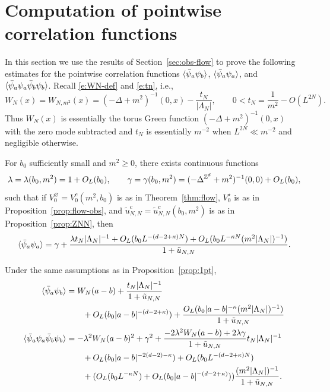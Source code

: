 \documentclass[11pt]{amsart}
\numberwithin{equation}{section}
\numberwithin{theorem}{section}
\newcommand{\1}{{\bf 1}}
\newcommand{\obs}{\star}
\newcommand{\Vbulk}{V^\varnothing}
\newcommand{\Vobs}{V^\obs}
\newcommand{\OL}{O_L}
\newcommand{\clambda}{\lambda}
\newcommand{\cgamma}{\gamma}
\begin{document}
\section{Computation of pointwise correlation functions}
\label{sec:obs}

In this section we use the results of Section~\ref{sec:obs-flow} to prove the following estimates for the pointwise
correlation functions $\langle \bar\psi_a\psi_b \rangle$,
$\langle \bar\psi_a\psi_a \rangle$, and
$\langle \bar\psi_a\psi_a\bar\psi_b\psi_b \rangle$.
Recall \eqref{e:WN-def} and   \eqref{e:tn}, i.e.,
\begin{equation}
  \label{e:WN-def-bis}
  W_N(x) = W_{N,m^2}(x) = (-\Delta+m^2)^{-1}(0,x) - \frac{t_N}{|\Lambda_N|}, \qquad 0< t_N = \frac{1}{m^2} - O(L^{2N}).
\end{equation}
Thus $W_N(x)$ is essentially the torus Green function
$(-\Delta+m^2)^{-1}(0,x)$ with the zero mode subtracted
and $t_N$ is essentially $m^{-2}$ when $L^{2N} \ll m^{-2}$ and negligible otherwise.

\begin{proposition} \label{prop:1pt}
  For $b_0$ sufficiently small and $m^2 \geq 0$, there exists continuous functions
  \begin{equation}
    \clambda =\clambda(b_0,m^2)= 1+\OL(b_0), \qquad \cgamma = \cgamma(b_0,m^2) = (-\Delta^{\Z^d}+m^2)^{-1}(0,0) + \OL(b_0),
  \end{equation}
  such that
  if $\Vbulk_{0}=V_{0}^{c}(m^{2},b_{0})$ is as in Theorem~\ref{thm:flow},
  $\Vobs_{0}$ is as in Proposition~\ref{prop:flow-obs},
  and $\tilde u_{N,N}^c=\tilde u_{N,N}^c(b_0,m^2)$ is as in Proposition~\ref{prop:ZNN},
  then
    \begin{equation} \label{e:2ptaa-bis}
    \avg{\bar\psi_a\psi_a} =
    \gamma
    + \frac{
      \clambda
      t_N |\Lambda_N|^{-1}
    + \OL(b_0L^{-(d-2+\kappa)N}) + \OL(b_0L^{-\kappa N}(m^{2}|\Lambda_N|)^{-1})
  }{1+\tilde u_{N,N}}
  .
\end{equation}
\end{proposition}

\begin{proposition} \label{prop:2pt}
  Under the same assumptions as in Proposition~\ref{prop:1pt},
    \begin{align}
    \label{e:2pt-a-bis}
    \avg{\bar\psi_a\psi_b}
    &=
      W_N(a-b)
      + \frac{
      t_N|\Lambda_N|^{-1}
      }{1+\tilde u_{N,N}}
      \nnb
      &\qquad
      + \OL(b_0|a-b|^{-(d-2+\kappa)})
      + 
      \frac{
      \OL(b_0|a-b|^{-\kappa} (m^2|\Lambda_N|)^{-1})
      }{1+\tilde u_{N,N}}
    \\
    \label{e:2pt-b-bis}
    \avg{\bar\psi_a\psi_a\bar\psi_b\psi_b}
      &= -\lambda^2 W_N(a-b)^2 + \gamma^2
        +\frac{-2\lambda^2 W_N(a-b)
        + 2\lambda\gamma
        }{1+\tilde u_{N,N}}t_N|\Lambda_N|^{-1}
      \nnb
      &\qquad
        + \OL(b_0 |a-b|^{-2(d-2)-\kappa})
        + \OL(b_0L^{-(d-2+\kappa)N})
        \nnb
      &\qquad
        + (
        \OL(b_0L^{-\kappa N}) + \OL(b_0 |a-b|^{-(d-2+\kappa)}))\frac{(m^{2}|\Lambda_N|)^{-1}}{1+\tilde u_{N,N}}
        .
  \end{align}
\end{proposition}
\end{document}
